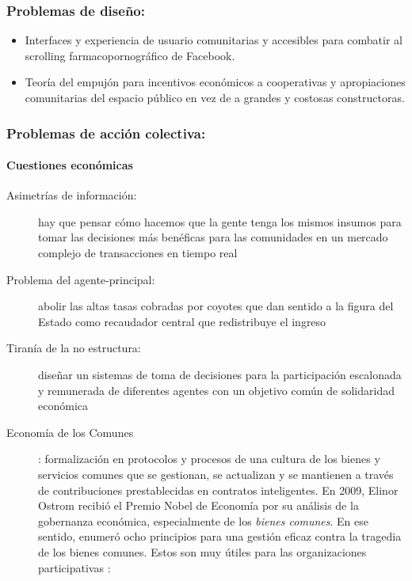 \subsubsection{Problemas de diseño:}
\label{ssub:problemas-de-diseno}

\begin{itemize}
  \item Interfaces y experiencia de usuario comunitarias y accesibles para combatir al scrolling farmacopornográfico de Facebook.
  \item Teoría del empujón para incentivos económicos a cooperativas y apropiaciones comunitarias del espacio público en vez de a grandes y costosas constructoras.
\end{itemize}

\subsubsection{Problemas de acción colectiva:}
\label{ssub:problemas-de-acción-colectiva}

\paragraph{Cuestiones económicas}
\label{par:cuestiones-económicas}

\begin{description}
  \item [Asimetrías de información:] hay que pensar cómo hacemos que la gente tenga los mismos insumos para tomar las decisiones más benéficas para las comunidades en un mercado complejo de transacciones en tiempo real
  \item [Problema del agente-principal:] abolir las altas tasas cobradas por coyotes que dan sentido a la figura del Estado como recaudador central que redistribuye el ingreso
  \item [Tiranía de la no estructura:] diseñar un sistemas de toma de decisiones para la participación escalonada y remunerada de diferentes agentes con un objetivo común de solidaridad económica
  \item [Economía de los Comunes]: formalización en protocolos y procesos de una cultura de los bienes y servicios comunes que se gestionan, se actualizan y se mantienen a través de contribuciones prestablecidas en contratos inteligentes. En 2009, Elinor Ostrom recibió el Premio Nobel de Economía por su análisis de la gobernanza económica, especialmente de los \emph{bienes comunes}. En ese sentido, enumeró ocho principios para una gestión eficaz contra la tragedia de los bienes comunes. Estos son muy útiles para las organizaciones participativas \autocite{allenParticipatoryOrganizationsPatterns2018}:
\end{description}

